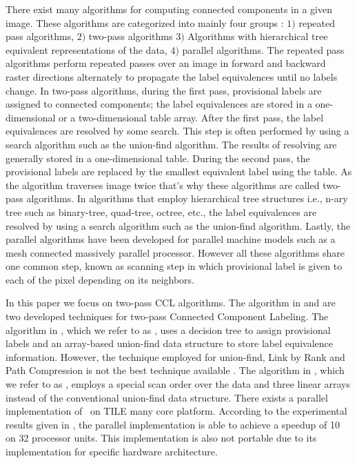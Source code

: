 There exist many algorithms for computing connected components in a given image. These algorithms are categorized into
mainly four groups %
\cite{Suzuki2003_Linear}
: $1)$ repeated pass
algorithms\cite{Haralick1981_Repeated,Hashizume1990_Algorithm}, $2)$ two-pass
algorithms\cite{gotoh1990high,gotoh1987component,komeichi1989video,lumia1983new,lumia1983new_c,naoi1995high,rosenfeld1970connectivity,
rosenfeld1966sequential,shirai1987labeling}
$3)$ Algorithms with hierarchical tree equivalent representations of the
data\cite{dillencourt1992general,gargantini1982separation,hecquard1991connected,samet1981connected,samet1985computing,samet1988efficient,
samet1986improved,tamminen1984efficient},
$4)$ parallel
algorithms\cite{bhattacharya1996connected,choudhary1994connected,
hirschberg1979computing,manohar1989connected,nassimi1980finding,olariu1993fast}.
The repeated pass algorithms perform repeated passes over an image in forward and backward raster directions alternately
to propagate the label equivalences until no labels change.
In two-pass algorithms, during the first pass, provisional labels are assigned to connected components;
the label equivalences are stored in a one-dimensional or a two-dimensional table array. After the first pass, the label 
equivalences are resolved by some search. This step is often performed by using
a search algorithm such as the union-find algorithm.
The results of resolving are generally stored in a one-dimensional table. During the second pass, the provisional labels are 
replaced by the smallest equivalent label using the table. As the algorithm traverses image twice that's why these algorithms 
are called two-pass algorithms.
In algorithms that employ hierarchical tree structures i.e., n-ary tree such as binary-tree, quad-tree, octree, etc., the
label equivalences are resolved by using a search algorithm such as the union-find algorithm.
Lastly, the parallel algorithms have been developed for parallel machine models such as a mesh connected massively parallel processor.
However all these algorithms share one common step, known as scanning step in
which provisional label is given to each of the pixel depending on its neighbors.

In this paper we focus on two-pass CCL algorithms. The algorithm in \cite{Wu2009_LRPC} and \cite{He2012_ARun} are two
developed techniques for two-pass Connected Component Labeling.
The algorithm in \cite{Wu2009_LRPC}, which we refer to as \lrpc, uses a decision tree to assign provisional labels and an 
array-based union-find data structure
to store label equivalence information. However, the technique employed for
union-find, Link by Rank and Path Compression is not the best technique available \cite{Patwary2012_PARemSP}. 
The algorithm in \cite{He2012_ARun}, which we refer to as \arun, employs a special scan order over the data and three linear
arrays instead of the conventional union-find data structure. There
exists a parallel implementation of \arun\ on TILE many core
platform\cite{Chen2013_PARun}. According to the
experimental results given in \cite{Chen2013_PARun}, the parallel implementation is able to achieve a speedup of 10 on
32 processor units. 
This implementation is also not portable due to its implementation for specific hardware architecture.


